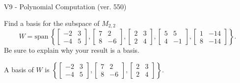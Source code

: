 \begin{exercise}
  \begin{exerciseTitle}V9 - Polynomial Computation (ver. 550)\end{exerciseTitle}
  \begin{exerciseStatement}
    Find a basis for the subspace of \(M_{2,2}\) 
\[W=\mathrm{span}\ \left\{\left[\begin{array}{cc}
-2 & 3 \\
-4 & 5
\end{array}\right] , \left[\begin{array}{cc}
7 & 2 \\
8 & -6
\end{array}\right] , \left[\begin{array}{cc}
2 & 3 \\
2 & 4
\end{array}\right] , \left[\begin{array}{cc}
5 & 5 \\
4 & -1
\end{array}\right] , \left[\begin{array}{cc}
1 & -14 \\
8 & -14
\end{array}\right]\right\}.\]
 Be sure to explain why your result is a basis.


  \end{exerciseStatement}
  \begin{exerciseAnswer}
   A basis of \(W\) is  \(\left\{\left[\begin{array}{cc}
-2 & 3 \\
-4 & 5
\end{array}\right] , \left[\begin{array}{cc}
7 & 2 \\
8 & -6
\end{array}\right] , \left[\begin{array}{cc}
2 & 3 \\
2 & 4
\end{array}\right]\right\}\).
  


  \end{exerciseAnswer}
\end{exercise}